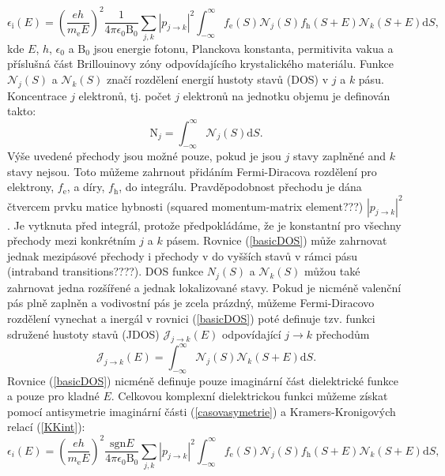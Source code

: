 \begin{equation}
\label{basicDOS}
\epsilon_\mathrm{i} (E) = 
\left(\frac{eh}{m_\mathrm{e}E} \right)^2 \frac{1}{4 \pi \epsilon_0 \mathrm{B}_0} \sum_{j,k} | p_{j \rightarrow k} |^2
\int_{-\infty}^\infty f_\mathrm{e}(S) \mathcal{N}_j(S) f_\mathrm{h}(S+E) \mathcal{N}_k(S + E)\mathrm{d}S \text{,}
\end{equation}
kde $E$, $h$, $\epsilon_0$ a $\mathrm{B}_0$ jsou energie fotonu, Planckova konstanta, permitivita vakua a příslušná část Brillouinovy zóny odpovídajícího krystalického materiálu. Funkce $\mathcal{N}_j(S)$ a $\mathcal{N}_k(S)$ značí rozdělení energií hustoty stavů (DOS) v $j$ a $k$ pásu. Koncentrace $j$ elektronů, tj. počet $j$ elektronů na jednotku objemu je definován takto:
\begin{equation}
\mathrm{N}_j = \int_{-\infty}^\infty \mathcal{N}_j(S)\mathrm{d}S \text{.}
\end{equation}
Výše uvedené přechody jsou možné pouze, pokud je jsou $j$ stavy zaplněné and $k$ stavy nejsou. Toto můžeme zahrnout přidáním Fermi-Diracova rozdělení pro elektrony, $f_\mathrm{e}$, a díry, $f_\mathrm{h}$, do integrálu. Pravděpodobnost přechodu je dána čtvercem prvku matice hybnosti (squared momentum-matrix element???) $|p_{j \rightarrow k}|^2$. Je vytknuta před integrál, protože předpokládáme, že je konstantní pro všechny přechody mezi konkrétním $j$ a $k$ pásem. Rovnice (\ref{basicDOS}) může zahrnovat jednak mezipásové přechody i přechody v do vyšších stavů v rámci pásu (intraband transitions????). DOS funkce ${N}_j(S)$ a $\mathcal{N}_k(S)$ můžou také zahrnovat jedna rozšířené a jednak lokalizované stavy. Pokud je nicméně valenční pás plně zaplněn a vodivostní pás je zcela prázdný, můžeme Fermi-Diracovo rozdělení vynechat a inergál v rovnici (\ref{basicDOS}) poté definuje tzv. funkci sdružené hustoty stavů (JDOS) $\mathcal{J}_{j \rightarrow k}(E)$ odpovídající $j \rightarrow k$ přechodům
\begin{equation}
\mathcal{J}_{j \rightarrow k}(E) = \int_{-\infty}^\infty \mathcal{N}_j(S) \mathcal{N}_k(S + E)\mathrm{d}S \text{.}
\end{equation}
Rovnice (\ref{basicDOS}) nicméně definuje pouze imaginární část dielektrické funkce a pouze pro kladné $E$. Celkovou komplexní dielektrickou funkci můžeme získat pomocí antisymetrie imaginární části (\ref{casovasymetrie}) a Kramers-Kronigových relací (\ref{KKint}):
\begin{equation}
\epsilon_i (E) = 
\left(\frac{eh}{m_\mathrm{e}E} \right)^2 \frac{\mathrm{sgn}{E}}{4 \pi \epsilon_0 \mathrm{B}_0} \sum_{j,k} | p_{j \rightarrow k} |^2
\int_{-\infty}^\infty f_\mathrm{e}(S) \mathcal{N}_j(S) f_\mathrm{h}(S+E) \mathcal{N}_k(S + E)\mathrm{d}S \text{,}
\end{equation}

